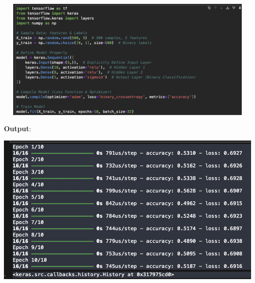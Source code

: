 \documentclass{article}
\begin{document}
\includegraphics[width=14cm,height=6cm]{Basic.png}


\textbf{Output}:

\includegraphics[width=14cm,height=6
cm]{Basic_Output.png}
\end{document}
